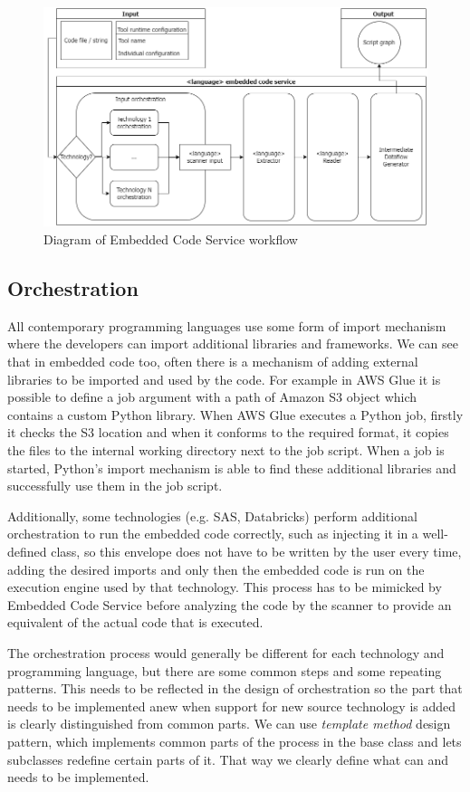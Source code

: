\begin{figure}[ht]\centering
\includegraphics[width=1.0\textwidth]{img/Embedded code service base design.png}
\caption{Diagram of Embedded Code Service workflow}
\label{fig:ECSbasedesign}
\end{figure}   

\subsection{Orchestration}

All contemporary programming languages use some form of import mechanism where the developers can import additional libraries and frameworks. We can see that in embedded code too, often there is a mechanism of adding external libraries to be imported and used by the code. For example in AWS Glue it is possible to define a job argument with a path of Amazon S3 object which contains a custom Python library. When AWS Glue executes a Python job, firstly it checks the S3 location and when it conforms to the required format, it copies the files to the internal working directory next to the job script. When a job is started, Python's import mechanism is able to find these additional libraries and successfully use them in the job script.
\par
Additionally, some technologies (e.g. SAS, Databricks) perform additional orchestration to run the embedded code correctly, such as injecting it in a well-defined class, so this envelope does not have to be written by the user every time, adding the desired imports and only then the embedded code is run on the execution engine used by that technology. This process has to be mimicked by Embedded Code Service before analyzing the code by the scanner to provide an equivalent of the actual code that is executed.
\par
The orchestration process would generally be different for each technology and programming language, but there are some common steps and some repeating patterns. This needs to be reflected in the design of orchestration so the part that needs to be implemented anew when support for new source technology is added is clearly distinguished from common parts. We can use \textit{template method} design pattern, which implements common parts of the process in the base class and lets subclasses redefine certain parts of it. That way we clearly define what can and needs to be implemented.

